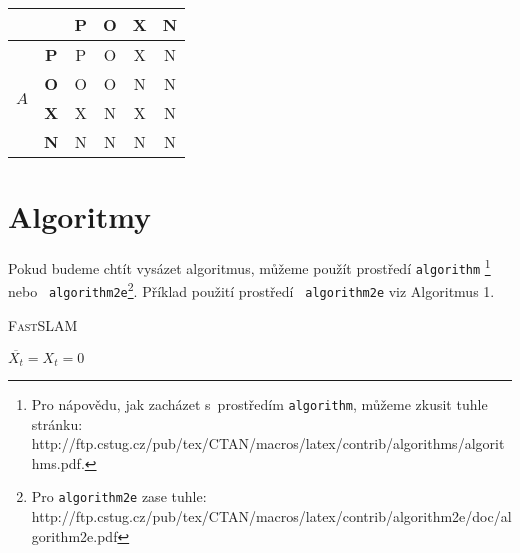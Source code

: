 \documentclass[a4paper, 11pt]{article}
\begin{document}
\begin{table} [h]
\begin{center}
\begin{tabular}{|c|c|c|c|c|c|}
				\multicolumn{2}{|c|}{} &  \textbf{P} & \textbf{O} & \textbf{X} & \textbf{N} \\ \hline
				\multirow{4}{*}{$A$}  & \textbf{P} & P & O & X & N\\ \cline{2-6}
				&  \textbf{O} & O & O & N & N \\ \cline{2-6}
				&  \textbf{X} & X & N & X & N \\ \cline{2-6}
				&  \textbf{N} & N & N & N & N \\ \hline
			\end{tabular}

	\label{tab2}
	\end{center}
\end{table}
	
\section{Algoritmy}
	Pokud budeme chtít vysázet algoritmus, můžeme použít prostředí \texttt{algorithm} \footnote{Pro nápovědu, jak zacházet s~prostředím \texttt{algorithm}, můžeme zkusit tuhle stránku:\\ http://ftp.cstug.cz/pub/tex/CTAN/macros/latex/contrib/algorithms/algorithms.pdf.} nebo \texttt{ algorithm2e}\footnote{Pro \texttt{algorithm2e} zase tuhle: http://ftp.cstug.cz/pub/tex/CTAN/macros/latex/contrib/algorithm2e/doc/algorithm2e.pdf}. 
	Příklad použití prostředí \texttt{ algorithm2e} viz Algoritmus 1.
\begin{algorithm}
	\SetAlgoNoLine
	\caption{\textsc{FastSLAM}}
		\label{alg1}
	\SetNlSty{}{}{:} \medskip \SetNlSkip{-1em} \Indp
	$\overline{X_t}=X_t=0$\\
\end{algorithm}
\end{document}
